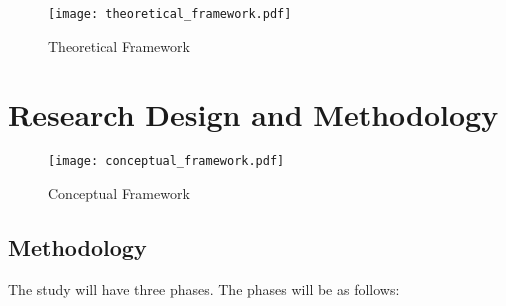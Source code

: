 \documentclass[10pt,11pt,12pt,oneside]{book}
\begin{document}
	\begin{figure}
	    \centering
	    \texttt{[image: theoretical\_framework.pdf]}
	    \caption{Theoretical Framework}
	    \label{fig:theoretical_framework}
	\end{figure}






\chapter{Research Design and Methodology}

\begin{figure}
	\centering
	\texttt{[image: conceptual\_framework.pdf]}
	\caption{Conceptual Framework}
	\label{fig:conceptual_framework}
\end{figure}
\clearpage



\section{Methodology}
The study will have three phases. The phases will be as follows:
\end{document}
